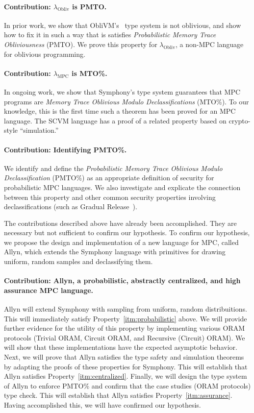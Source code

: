 \documentclass{report}
\newcommand{\lang}{Allyn\xspace}
\newcommand{\mpc}{\ensuremath{\lambda_{\mathrm{MPC}}}\xspace}
\newcommand{\obliv}{\ensuremath{\lambda_{\mathrm{Obliv}}}\xspace}
\begin{document}
\paragraph{Contribution: \obliv is PMTO.} In prior work, we show that ObliVM's~\cite{todo} type system is not oblivious,
and show how to fix it in
such a way that is satisfies \emph{Probabilistic Memory Trace Obliviousness} (PMTO). We prove this property for \obliv, a non-MPC language
for oblivious programming.

\paragraph{Contribution: \mpc is MTO\%.} In ongoing work, we show that Symphony's type system guarantees that MPC programs are
\emph{Memory Trace Oblivious Modulo Declassifications} (MTO\%). To our knowledge, this is the first time such a theorem has been
proved for an MPC language. The SCVM language has a proof of a related property based on crypto-style ``simulation.''

\paragraph{Contribution: Identifying PMTO\%.} We identify and define the \emph{Probabilistic Memory Trace Oblivious Modulo Declassification}
(PMTO\%) as an appropriate definition of security for probabilistic MPC languages. We also investigate and explicate the connection between
this property and other common security properties involving declassifications (such as Gradual Release~\cite{todo}).

The contributions described above have already been accomplished. They are necessary but not sufficient to confirm our hypothesis.
To confirm our hypothesis, we propose the design and implementation of a new language for MPC, called \lang, which extends the
Symphony language with primitives for drawing uniform, random samples and declassifying them.

\paragraph{Contribution: \lang, a probabilistic, abstractly centralized, and high assurance MPC language.}
\lang will extend Symphony with sampling from uniform, random distribuitions. This will immediately satisfy
Property~\ref{itm:probabilistic} above. We will provide further evidence for the utility of this property by
implementing various ORAM protocols (Trivial ORAM, Circuit ORAM, and Recursive (Circuit) ORAM). We will
show that these implementations have the expected asymptotic behavior. Next, we will prove that \lang satisfies
the type safety and simulation theorems by adapting the proofs of these properties for Symphony. This will establish
that \lang satisfies Property~\ref{itm:centralized}.
Finally, we will design the type system of \lang to enforce PMTO\% and confirm that the case studies (ORAM protocols) type check.
This will establish that \lang satisfies Property~\ref{itm:assurance}. Having
accomplished this, we will have confirmed our hypothesis.
\end{document}
